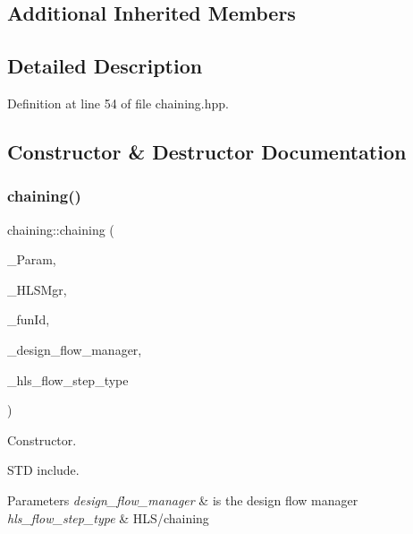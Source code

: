 \subsection*{Additional Inherited Members}


\subsection{Detailed Description}


Definition at line 54 of file chaining.\+hpp.



\subsection{Constructor \& Destructor Documentation}
\mbox{\label{classchaining_a051b34ca72155fde015f0a303564dcba}} 
\subsubsection{\texorpdfstring{chaining()}{chaining()}}
{\footnotesize\ttfamily chaining\+::chaining (\begin{DoxyParamCaption}\item[{const \hyperlink{Parameter_8hpp_a37841774a6fcb479b597fdf8955eb4ea}{Parameter\+Const\+Ref}}]{\+\_\+\+Param,  }\item[{const \hyperlink{hls__manager_8hpp_acd3842b8589fe52c08fc0b2fcc813bfe}{H\+L\+S\+\_\+manager\+Ref}}]{\+\_\+\+H\+L\+S\+Mgr,  }\item[{unsigned int}]{\+\_\+fun\+Id,  }\item[{const Design\+Flow\+Manager\+Const\+Ref}]{\+\_\+design\+\_\+flow\+\_\+manager,  }\item[{const \hyperlink{hls__step_8hpp_ada16bc22905016180e26fc7e39537f8d}{H\+L\+S\+Flow\+Step\+\_\+\+Type}}]{\+\_\+hls\+\_\+flow\+\_\+step\+\_\+type }\end{DoxyParamCaption})}



Constructor. 

S\+TD include.


\begin{DoxyParams}{Parameters}
{\em design\+\_\+flow\+\_\+manager} & is the design flow manager \\
\hline
{\em hls\+\_\+flow\+\_\+step\+\_\+type} & H\+L\+S/chaining \\
\hline
\end{DoxyParams}


